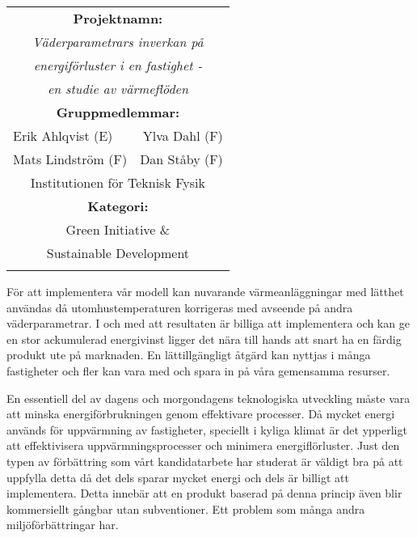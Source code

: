 \documentclass[11pt,a4paper]{article}
\begin{document}
\begin{multicols}{2}
\renewcommand{\arraystretch}{1.2}
\noindent
\resizebox{8cm}{!} {
\begin{tabular}{l r}
\hline
\multicolumn{2}{|c|}{\cellcolor{YellowGreen} \textbf{Projektnamn:}}\\[3pt]
\multicolumn{2}{|c|}{\cellcolor{YellowGreen} \textit{Väderparametrars inverkan på}}\\
\multicolumn{2}{|c|}{\cellcolor{YellowGreen} \textit{energiförluster i en fastighet -}}\\
\multicolumn{2}{|c|}{\cellcolor{YellowGreen} \textit{en studie av värmeflöden}}\\
\multicolumn{2}{|c|}{\cellcolor{YellowGreen} \textbf{Gruppmedlemmar:}} \\[3pt]
\multicolumn{1}{|l}{\cellcolor{YellowGreen} Erik Ahlqvist (E)} & \multicolumn{1}{r|}{\cellcolor{YellowGreen} Ylva Dahl (F)}\\
\multicolumn{1}{|l}{\cellcolor{YellowGreen} Mats Lindström (F)} & \multicolumn{1}{r|}{\cellcolor{YellowGreen} Dan Ståby (F)}\\
\multicolumn{2}{|c|}{\cellcolor{YellowGreen} Institutionen för Teknisk Fysik} \\
\multicolumn{2}{|c|}{\cellcolor{YellowGreen} \textbf{Kategori:}} \\[3pt]
\multicolumn{2}{|c|}{\cellcolor{YellowGreen} Green Initiative \&}\\
\multicolumn{2}{|c|}{\cellcolor{YellowGreen} Sustainable Development}\\
\hline
& \\
\end{tabular}
}


För att implementera vår modell kan nuvarande värmeanläggningar med lätthet användas då utomhustemperaturen korrigeras med avseende på andra väderparametrar.
I och med att resultaten är billiga att implementera och kan ge en stor ackumulerad energivinst ligger det nära till hands att snart ha en färdig produkt ute på marknaden. En lättillgängligt åtgärd kan nyttjas i många fastigheter och fler kan vara med och spara in på våra gemensamma resurser. 

En essentiell del av dagens och morgondagens teknologiska utveckling måste vara
att minska energiförbrukningen genom effektivare processer. Då mycket energi
används för uppvärmning av fastigheter, speciellt i kyliga klimat
är det ypperligt att effektivisera uppvärmningsprocesser och
minimera energiflörluster. Just den typen av förbättring som vårt kandidatarbete
har studerat är väldigt bra på att uppfylla detta då det dels sparar mycket energi
och dels är billigt att implementera. Detta innebär att en produkt baserad på
denna princip även blir kommersiellt gångbar utan subventioner. Ett problem
som många andra miljöförbättringar har.


\end{multicols}
\end{document}
